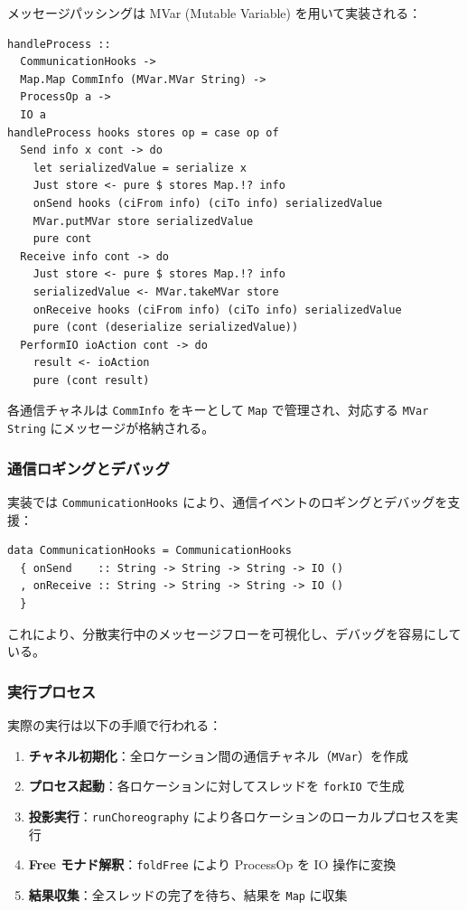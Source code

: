メッセージパッシングは MVar (Mutable Variable) を用いて実装される：

\begin{verbatim}
handleProcess ::
  CommunicationHooks ->
  Map.Map CommInfo (MVar.MVar String) ->
  ProcessOp a ->
  IO a
handleProcess hooks stores op = case op of
  Send info x cont -> do
    let serializedValue = serialize x
    Just store <- pure $ stores Map.!? info
    onSend hooks (ciFrom info) (ciTo info) serializedValue
    MVar.putMVar store serializedValue
    pure cont
  Receive info cont -> do
    Just store <- pure $ stores Map.!? info
    serializedValue <- MVar.takeMVar store
    onReceive hooks (ciFrom info) (ciTo info) serializedValue
    pure (cont (deserialize serializedValue))
  PerformIO ioAction cont -> do
    result <- ioAction
    pure (cont result)
\end{verbatim}

各通信チャネルは \texttt{CommInfo} をキーとして \texttt{Map} で管理され、対応する \texttt{MVar String} にメッセージが格納される。

\subsubsection{通信ロギングとデバッグ}

実装では \texttt{CommunicationHooks} により、通信イベントのロギングとデバッグを支援：

\begin{verbatim}
data CommunicationHooks = CommunicationHooks
  { onSend    :: String -> String -> String -> IO ()
  , onReceive :: String -> String -> String -> IO ()
  }
\end{verbatim}

これにより、分散実行中のメッセージフローを可視化し、デバッグを容易にしている。

\subsubsection{実行プロセス}

実際の実行は以下の手順で行われる：

\begin{enumerate}
\item \textbf{チャネル初期化}：全ロケーション間の通信チャネル（\texttt{MVar}）を作成
\item \textbf{プロセス起動}：各ロケーションに対してスレッドを \texttt{forkIO} で生成
\item \textbf{投影実行}：\texttt{runChoreography} により各ロケーションのローカルプロセスを実行
\item \textbf{Free モナド解釈}：\texttt{foldFree} により ProcessOp を IO 操作に変換
\item \textbf{結果収集}：全スレッドの完了を待ち、結果を \texttt{Map} に収集
\end{enumerate}

